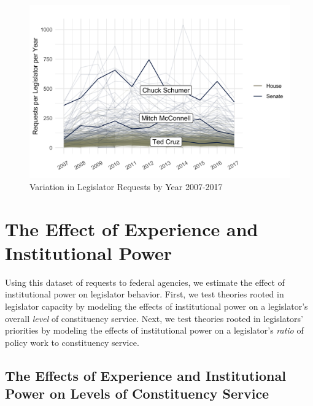 \documentclass[12pt]{article}
\begin{document}
\begin{figure}
\centering
\caption{Variation in Legislator Requests by Year 2007-2017} \label{f:peryear} 
\begin{minipage}{\textwidth}
\includegraphics[width = \textwidth]{figs/counts-per-year-1}
\end{minipage}
\end{figure}




\section{The Effect of Experience and Institutional Power}\label{s:results} 

Using this dataset of requests to federal agencies, we estimate the effect of institutional power on legislator behavior. First, we test theories rooted in legislator capacity by modeling the effects of institutional power on a legislator's overall \textit{level} of constituency service. Next, we test theories rooted in legislators' priorities by modeling the effects of institutional power on a legislator's  \textit{ratio} of policy work to constituency service. %

\subsection{The Effects of Experience and Institutional Power on Levels of Constituency Service}\label{s:prestige}
\end{document}
